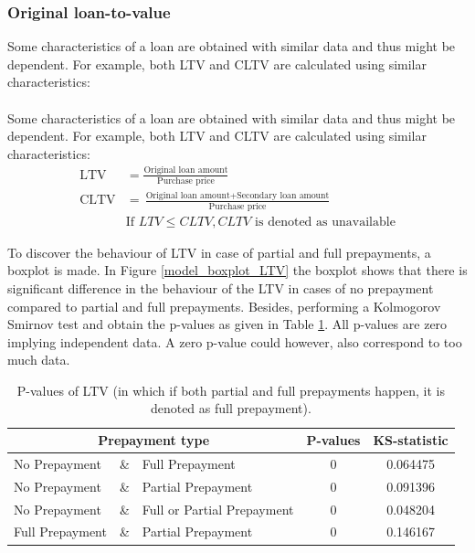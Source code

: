     \subsubsection{Original loan-to-value}
        Some characteristics of a loan are obtained with similar data and thus might be dependent. For example, both LTV and CLTV are calculated using similar characteristics: 
        \\\\
        Some characteristics of a loan are obtained with similar data and thus might be dependent. For example, both LTV and CLTV are calculated using similar characteristics: 
        \begin{align}
            \text{LTV}&=\frac{\text{Original loan amount}}{\text{Purchase price}}\\
            \text{CLTV}&=\frac{\text{Original loan amount}+\text{Secondary loan amount}}{\text{Purchase price}}\\
            &\text{If } LTV \leq CLTV, CLTV \text{ is denoted as unavailable}
        \end{align}
    
    
        To discover the behaviour of LTV in case of partial and full prepayments, a boxplot is made. In Figure \ref{model_boxplot_LTV} the boxplot shows that there is significant difference in the behaviour of the LTV in cases of no prepayment compared to partial and full prepayments. Besides, performing a Kolmogorov Smirnov test and obtain the p-values as given in Table \ref{model_Pvals_of_LTV}. All p-values are zero implying independent data. A zero p-value could however, also correspond to too much data. 
        \begin{table}[H]
        \centering
            \begin{tabular}{lcl|c|c}
            \multicolumn{3}{c}{Prepayment type} & P-values& KS-statistic \\\hline
            No Prepayment & \& & Full Prepayment & 0 & 0.064475\\
            No Prepayment & \& & Partial Prepayment & 0 & 0.091396\\
            No Prepayment & \& & Full or Partial Prepayment & 0 & 0.048204 \\
            Full Prepayment & \& & Partial Prepayment & 0 & 0.146167
		    \end{tabular}
            \caption{P-values of LTV (in which if both partial and full prepayments happen, it is denoted as full prepayment).}
	        \label{model_Pvals_of_LTV}
        \end{table}
    
